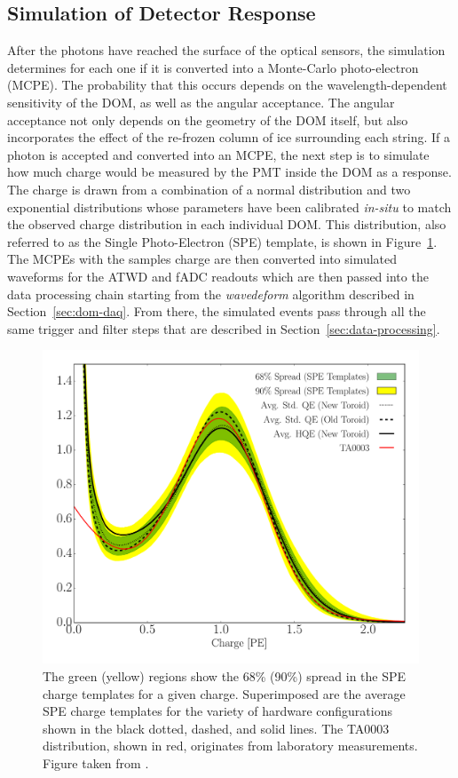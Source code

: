 \subsection{Simulation of Detector Response}

After the photons have reached the surface of the optical sensors, the simulation determines for each one if it is converted into a Monte-Carlo photo-electron (MCPE). The probability that this occurs depends on the wavelength-dependent sensitivity of the DOM, as well as the angular acceptance. The angular acceptance not only depends on the geometry of the DOM itself, but also incorporates the effect of the re-frozen column of ice surrounding each string. If a photon is accepted and converted into an MCPE, the next step is to simulate how much charge would be measured by the PMT inside the DOM as a response. The charge is drawn from a combination of a normal distribution and two exponential distributions whose parameters have been calibrated \emph{in-situ} to match the observed charge distribution in each individual DOM. This distribution, also referred to as the Single Photo-Electron (SPE) template, is shown in Figure~\ref{fig:spe-templates}. The MCPEs with the samples charge are then converted into simulated waveforms for the ATWD and fADC readouts which are then passed into the data processing chain starting from the \emph{wavedeform} algorithm described in Section~\ref{sec:dom-daq}. From there, the simulated events pass through all the same trigger and filter steps that are described in Section~\ref{sec:data-processing}.

\begin{figure}
    \centering
    \includegraphics[width=0.8\linewidth]{figures/icecube/detector_response/SPE_TA003_2.pdf}
    \caption{The green (yellow) regions show the 68\% (90\%) spread in the SPE charge templates for a given charge.  Superimposed are the average SPE charge templates for the variety of hardware configurations shown in the black dotted, dashed, and solid lines. The TA0003 distribution, shown in red, originates from laboratory measurements. Figure taken from \cite{ic_spe_20}.}
    \label{fig:spe-templates}
\end{figure}

